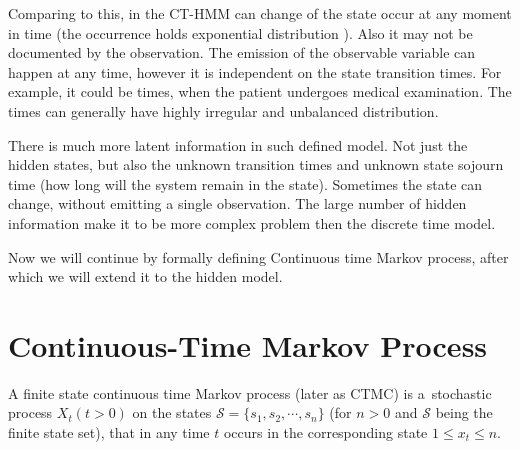 \documentclass[thesis=M,english]{FITthesis}[2012/10/20]
\begin{document}
Comparing to this, in the CT-HMM can change of the state occur at any moment in time (the occurrence holds exponential distribution ). Also it may not be documented by the observation. The emission of the observable variable can happen at any time, however it is independent on the state transition times. For example, it could be times, when the patient undergoes medical examination. The times can generally have highly irregular and unbalanced distribution.

There is much more latent information in such defined model. Not just the hidden states, but also the unknown transition times and unknown state sojourn time (how long will the system remain in the state).
Sometimes the state can change, without emitting a single observation. The large number of hidden information make it to be more complex problem then the discrete time model.

Now we will continue by formally defining Continuous time Markov process, after which we will extend it to the hidden model.

\section{Continuous-Time Markov Process} 

A finite state continuous time Markov process (later as CTMC) is a~stochastic process $X_t (t > 0)$ on the states $\mathcal{S} = \{ s_1, s_2, \cdots, s_n \}$  (for $n>0$ and $\mathcal{S}$ being the finite state set), that in any time $t$  occurs in the corresponding state $1 \leq x_t \leq n$. 
\end{document}
